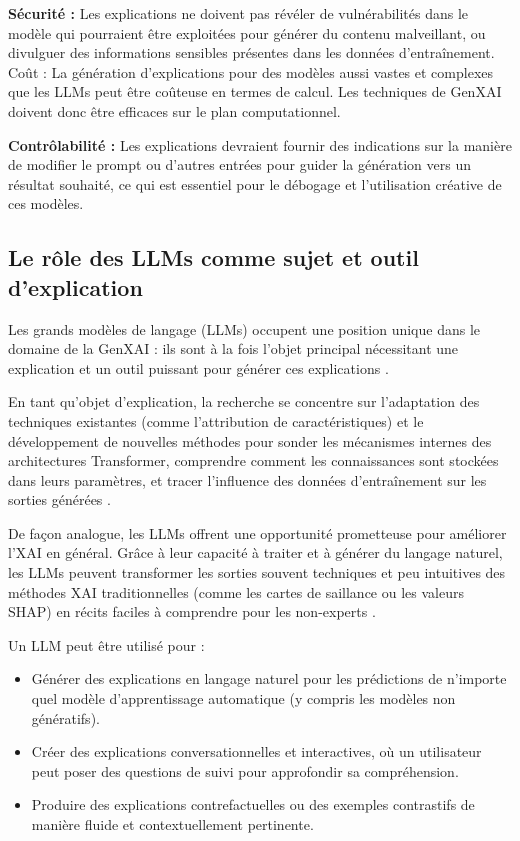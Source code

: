 \textbf{Sécurité :} Les explications ne doivent pas révéler de vulnérabilités dans le modèle qui pourraient être exploitées pour générer du contenu malveillant, ou divulguer des informations sensibles présentes dans les données d'entraînement.
Coût : La génération d'explications pour des modèles aussi vastes et complexes que les LLMs peut être coûteuse en termes de calcul. Les techniques de GenXAI doivent donc être efficaces sur le plan computationnel.

\textbf{Contrôlabilité :} Les explications devraient fournir des indications sur la manière de modifier le prompt ou d'autres entrées pour guider la génération vers un résultat souhaité, ce qui est essentiel pour le débogage et l'utilisation créative de ces modèles.
\subsection{Le rôle des LLMs comme sujet et outil d'explication}
Les grands modèles de langage (LLMs) occupent une position unique dans le domaine de la GenXAI : ils sont à la fois l'objet principal nécessitant une explication et un outil puissant pour générer ces explications \citep{Singh2024, Liao2023}.

En tant qu'objet d'explication, la recherche se concentre sur l'adaptation des techniques existantes (comme l'attribution de caractéristiques) et le développement de nouvelles méthodes pour sonder les mécanismes internes des architectures Transformer, comprendre comment les connaissances sont stockées dans leurs paramètres, et tracer l'influence des données d'entraînement sur les sorties générées \citep{Zhao2023a, Luo2024}.

De façon analogue, les LLMs offrent une opportunité prometteuse pour améliorer l'XAI en général. Grâce à leur capacité à traiter et à générer du langage naturel, les LLMs peuvent transformer les sorties souvent techniques et peu intuitives des méthodes XAI traditionnelles (comme les cartes de saillance ou les valeurs SHAP) en récits faciles à comprendre pour les non-experts \citet{Norori2021}.

Un LLM peut être utilisé pour :
\begin{itemize}[label=\textbullet]
    \item Générer des explications en langage naturel pour les prédictions de n'importe quel modèle d'apprentissage automatique (y compris les modèles non génératifs).
    \item Créer des explications conversationnelles et interactives, où un utilisateur peut poser des questions de suivi pour approfondir sa compréhension.
    \item Produire des explications contrefactuelles ou des exemples contrastifs de manière fluide et contextuellement pertinente.
\end{itemize}

